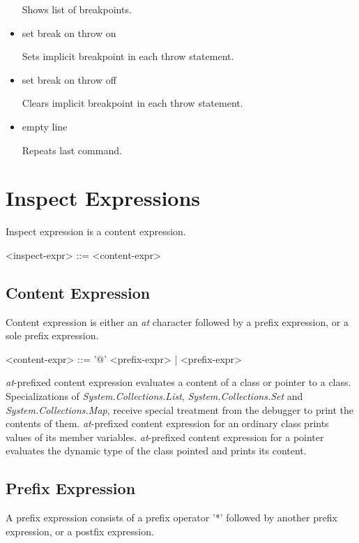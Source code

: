 \documentclass[oneside, a4paper, 11pt]{article}
\begin{document}
\begin{itemize}
Shows list of breakpoints.

\item set break on throw on

Sets implicit breakpoint in each throw statement.

\item set break on throw off

Clears implicit breakpoint in each throw statement.

\item empty line

Repeats last command.

\end{itemize}

\section{Inspect Expressions}

Inspect expression is a content expression.

\begin{grammar}
<inspect-expr> ::= <content-expr>
\end{grammar}

\subsection{Content Expression}

Content expression is either an \emph{at} character followed
by a prefix expression, or a sole prefix expression.

\begin{grammar}
<content-expr> ::= '@' <prefix-expr> | <prefix-expr>
\end{grammar}

\emph{at}-prefixed content expression evaluates a content
of a class or pointer to a class.
Specializations of \emph{System.Collections.List},
\emph{System.Collections.Set} and \emph{System.Collections.Map},
receive special treatment from the debugger to print the
contents of them. \emph{at}-prefixed content expression for an ordinary class
prints values of its member variables.
\emph{at}-prefixed content expression for a pointer evaluates the
dynamic type of the class pointed and prints its content.

\subsection{Prefix Expression}

A prefix expression consists of a prefix operator '*' followed by
another prefix expression, or a postfix expression.
\end{document}

